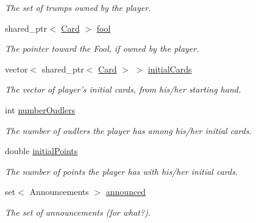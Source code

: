 \begin{DoxyCompactItemize}
\begin{DoxyCompactList}\small\item\em \-The set of trumps owned by the player. \end{DoxyCompactList}\item 
\hypertarget{classPlayer_a9dfead246bd18b99398c89777290a162}{shared\-\_\-ptr$<$ \hyperlink{classCard}{\-Card} $>$ \hyperlink{classPlayer_a9dfead246bd18b99398c89777290a162}{fool}}\label{classPlayer_a9dfead246bd18b99398c89777290a162}

\begin{DoxyCompactList}\small\item\em \-The pointer toward the \-Fool, if owned by the player. \end{DoxyCompactList}\item 
\hypertarget{classPlayer_aac0d154d58a07310ee23c3c763f2cfa9}{vector$<$ shared\-\_\-ptr$<$ \hyperlink{classCard}{\-Card} $>$ $>$ \hyperlink{classPlayer_aac0d154d58a07310ee23c3c763f2cfa9}{initial\-Cards}}\label{classPlayer_aac0d154d58a07310ee23c3c763f2cfa9}

\begin{DoxyCompactList}\small\item\em \-The vector of player's initial cards, from his/her starting hand. \end{DoxyCompactList}\item 
\hypertarget{classPlayer_a9f218c1ff377eaeb7a336156410f7386}{int \hyperlink{classPlayer_a9f218c1ff377eaeb7a336156410f7386}{number\-Oudlers}}\label{classPlayer_a9f218c1ff377eaeb7a336156410f7386}

\begin{DoxyCompactList}\small\item\em \-The number of oudlers the player has among his/her initial cards. \end{DoxyCompactList}\item 
\hypertarget{classPlayer_af625acf7f8ad267630c7e3bd50d2683b}{double \hyperlink{classPlayer_af625acf7f8ad267630c7e3bd50d2683b}{initial\-Points}}\label{classPlayer_af625acf7f8ad267630c7e3bd50d2683b}

\begin{DoxyCompactList}\small\item\em \-The number of points the player has with his/her initial cards. \end{DoxyCompactList}\item 
\hypertarget{classPlayer_a90efe0cf8930297c7d30805d19763b65}{set$<$ \-Announcements $>$ \hyperlink{classPlayer_a90efe0cf8930297c7d30805d19763b65}{announced}}\label{classPlayer_a90efe0cf8930297c7d30805d19763b65}

\begin{DoxyCompactList}\small\item\em \-The set of announcements (for what?). \end{DoxyCompactList}\end{DoxyCompactItemize}



